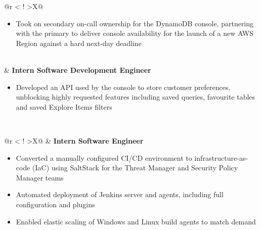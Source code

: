 \begin{table}[H]
\begin{tabularx}{\textwidth}{@{}r <{\hskip -3pt} !{\foo} >{}X@{}}
\begin{itemize}[topsep=5pt]
            \item Took on secondary on-call ownership for the DynamoDB console, partnering with the primary to deliver console availability for the launch of a new AWS Region against a hard next-day deadline
        \end{itemize} \\
        & \textbf{Intern Software Development Engineer} \hfill {}
        \parbox{\textwidth}{}
        \begin{itemize}[topsep=5pt]
            \item Developed an API used by the console to store customer preferences, unblocking highly requested features including saved queries, favourite tables and saved Explore Items filters
        \end{itemize} \\
    \end{tabularx}
\end{table}
\vspace{-1.2em}

\begin{table}[H]
    \renewcommand\arraystretch{1.4}
    \begin{tabularx}{\textwidth}{@{}r <{\hskip -3pt} !{\foo} >{}X@{}}
        \addlinespace[1.5ex]
        & \textbf{Intern Software Engineer} \hfill {}
        \parbox{\textwidth}{}
        \begin{itemize}[topsep=5pt]
            \item Converted a manually configured CI/CD environment to infrastructure-as-code (IaC) using SaltStack for the Threat Manager and Security Policy Manager teams
            \item Automated deployment of Jenkins server and agents, including full configuration and plugins
            \item Enabled elastic scaling of Windows and Linux build agents to match demand
        \end{itemize} \\
    \end{tabularx}
\end{table}
\vspace{-1.2em}
